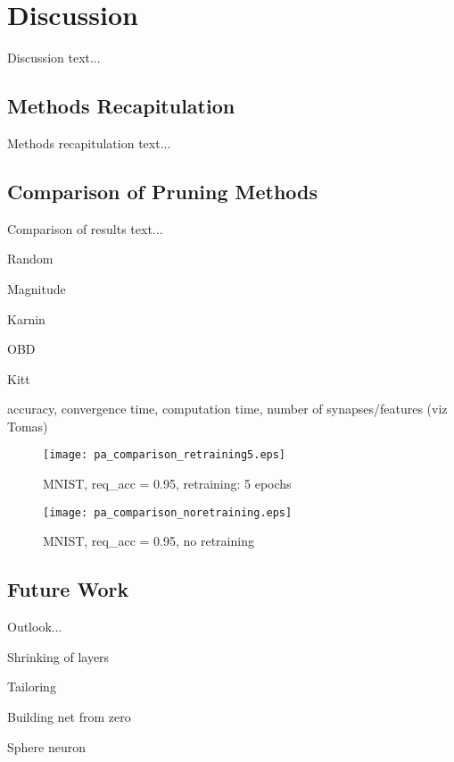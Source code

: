\chapter{Discussion} \label{chap:discussion}
Discussion text...

\section{Methods Recapitulation} \label{sec:methods_recapitulation}
Methods recapitulation text...

\section{Comparison of Pruning Methods} \label{sec:comparison_of_pruning_methods}
Comparison of results text...

Random

Magnitude

Karnin

OBD

Kitt
\newpage

accuracy, convergence time, computation time, number of synapses/features (viz Tomas)

\begin{figure}[H]
\centering
\texttt{[image: pa\_comparison\_retraining5.eps]}
\caption{MNIST, req\_acc = 0.95, retraining: 5 epochs}
\label{fig:discussion:pa_comparison_retraining5}
\end{figure}

\newpage

\begin{figure}[H]
\centering
\texttt{[image: pa\_comparison\_noretraining.eps]}
\caption{MNIST, req\_acc = 0.95, no retraining}
\label{fig:discussion:pa_comparison_noretraining}
\end{figure}

\section{Future Work} \label{sec:future_work}
Outlook...

Shrinking of layers

Tailoring

Building net from zero

Sphere neuron
